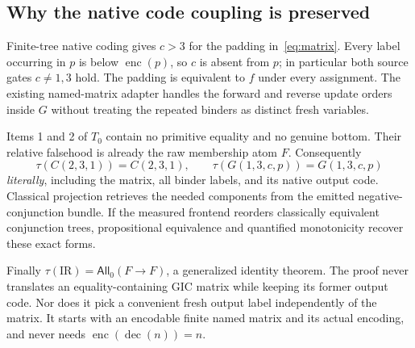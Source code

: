 \documentclass[11pt,letterpaper]{article}
\theoremstyle{definition}\newtheorem{definition}[theorem]{Definition}
\theoremstyle{remark}\newtheorem{remark}[theorem]{Remark}
\newcommand{\All}{\mathsf{All}}
\newcommand{\enc}{\operatorname{enc}}
\newcommand{\dec}{\operatorname{dec}}
\newcommand{\To}{\rightarrow}
\begin{document}
\subsection{Why the native code coupling is preserved}
Finite-tree native coding gives $c>3$ for the padding in~\eqref{eq:matrix}. Every label occurring in $p$ is below $\enc(p)$, so $c$ is absent from $p$; in particular both source gates $c\ne1,3$ hold. The padding is equivalent to $f$ under every assignment. The existing named-matrix adapter handles the forward and reverse update orders inside $G$ without treating the repeated binders as distinct fresh variables.

Items 1 and 2 of $T_0$ contain no primitive equality and no genuine bottom. Their relative falsehood is already the raw membership atom $F$. Consequently
\[
 \tau(C(2,3,1))=C(2,3,1),\qquad
 \tau(G(1,3,c,p))=G(1,3,c,p)
\]
\emph{literally}, including the matrix, all binder labels, and its native output code. Classical projection retrieves the needed components from the emitted negative-conjunction bundle. If the measured frontend reorders classically equivalent conjunction trees, propositional equivalence and quantified monotonicity recover these exact forms.

Finally $\tau(\mathrm{IR})=\All_0(F\To F)$, a generalized identity theorem. The proof never translates an equality-containing GIC matrix while keeping its former output code. Nor does it pick a convenient fresh output label independently of the matrix. It starts with an encodable finite named matrix and its actual encoding, and never needs $\enc(\dec(n))=n$.
\end{document}

